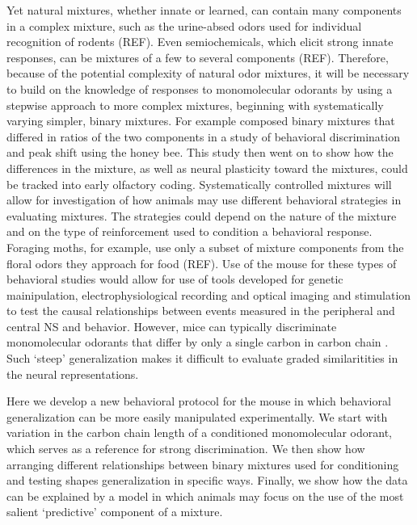  Yet natural mixtures, whether innate or learned, can contain many components in a complex mixture, such as the urine-absed odors used for individual recognition of rodents (REF). 
 Even semiochemicals, which elicit strong innate responses,  can be mixtures of a few to several components (REF). 
 Therefore, because of the potential complexity of natural odor mixtures, it will be necessary to build on the knowledge of responses to monomolecular odorants by using a stepwise approach to more complex mixtures, beginning with systematically varying simpler, binary mixtures. 
 For example \cite{19692594} composed binary mixtures that differed in ratios of the two components in a study of behavioral discrimination and peak shift using the honey bee. 
 This study then went on to show how the differences in the mixture, as well as neural plasticity toward the mixtures, could be tracked into early olfactory coding. 
Systematically controlled mixtures will allow for investigation of how animals may use different behavioral strategies in evaluating mixtures. 
The strategies could depend on the nature of the mixture and on the type of reinforcement used to condition a behavioral response. 
Foraging moths, for example, use only a subset of mixture components from the floral odors they approach for food (REF). Use of the mouse for these types of behavioral studies would allow for use of tools developed for genetic mainipulation, electrophysiological recording and optical imaging and stimulation to test the causal relationships between events measured in the peripheral and central NS and behavior. 
However, mice can typically discriminate monomolecular odorants that differ by only a single carbon in carbon chain \cite{18810459}. 
Such ‘steep’ generalization makes it difficult to evaluate graded similaritities in the neural representations. 

Here  we develop a new behavioral protocol for the mouse in which behavioral generalization can be more easily manipulated experimentally. 
We start with variation in the carbon chain length of a conditioned monomolecular odorant, which serves as a reference for strong discrimination. 
We then show how arranging different relationships between binary mixtures used for conditioning and testing shapes generalization in specific ways. 
Finally, we show how the data can be explained by a model in which animals may focus on the use of the most salient ‘predictive’ component of a mixture. 